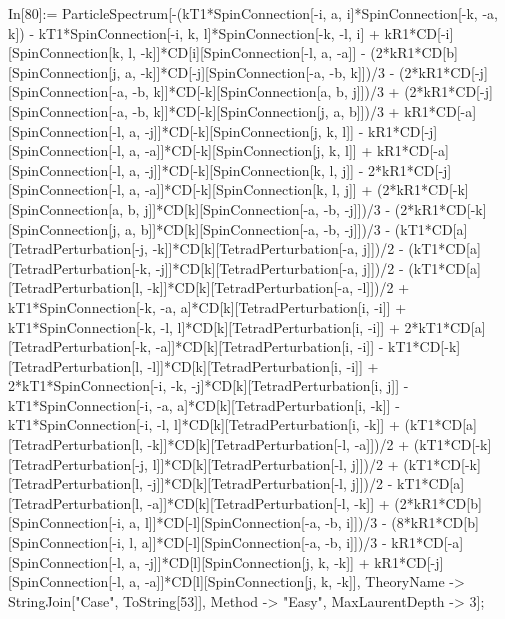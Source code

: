 In[80]:= ParticleSpectrum[-(kT1*SpinConnection[-i, a, i]*SpinConnection[-k, -a, k]) - kT1*SpinConnection[-i, k, l]*SpinConnection[-k, -l, i] + kR1*CD[-i][SpinConnection[k, l, -k]]*CD[i][SpinConnection[-l, a, -a]] - (2*kR1*CD[b][SpinConnection[j, a, -k]]*CD[-j][SpinConnection[-a, -b, k]])/3 - (2*kR1*CD[-j][SpinConnection[-a, -b, k]]*CD[-k][SpinConnection[a, b, j]])/3 + (2*kR1*CD[-j][SpinConnection[-a, -b, k]]*CD[-k][SpinConnection[j, a, b]])/3 + kR1*CD[-a][SpinConnection[-l, a, -j]]*CD[-k][SpinConnection[j, k, l]] - kR1*CD[-j][SpinConnection[-l, a, -a]]*CD[-k][SpinConnection[j, k, l]] + kR1*CD[-a][SpinConnection[-l, a, -j]]*CD[-k][SpinConnection[k, l, j]] - 2*kR1*CD[-j][SpinConnection[-l, a, -a]]*CD[-k][SpinConnection[k, l, j]] + (2*kR1*CD[-k][SpinConnection[a, b, j]]*CD[k][SpinConnection[-a, -b, -j]])/3 - (2*kR1*CD[-k][SpinConnection[j, a, b]]*CD[k][SpinConnection[-a, -b, -j]])/3 - (kT1*CD[a][TetradPerturbation[-j, -k]]*CD[k][TetradPerturbation[-a, j]])/2 - (kT1*CD[a][TetradPerturbation[-k, -j]]*CD[k][TetradPerturbation[-a, j]])/2 - (kT1*CD[a][TetradPerturbation[l, -k]]*CD[k][TetradPerturbation[-a, -l]])/2 + kT1*SpinConnection[-k, -a, a]*CD[k][TetradPerturbation[i, -i]] + kT1*SpinConnection[-k, -l, l]*CD[k][TetradPerturbation[i, -i]] + 2*kT1*CD[a][TetradPerturbation[-k, -a]]*CD[k][TetradPerturbation[i, -i]] - kT1*CD[-k][TetradPerturbation[l, -l]]*CD[k][TetradPerturbation[i, -i]] + 2*kT1*SpinConnection[-i, -k, -j]*CD[k][TetradPerturbation[i, j]] - kT1*SpinConnection[-i, -a, a]*CD[k][TetradPerturbation[i, -k]] - kT1*SpinConnection[-i, -l, l]*CD[k][TetradPerturbation[i, -k]] + (kT1*CD[a][TetradPerturbation[l, -k]]*CD[k][TetradPerturbation[-l, -a]])/2 + (kT1*CD[-k][TetradPerturbation[-j, l]]*CD[k][TetradPerturbation[-l, j]])/2 + (kT1*CD[-k][TetradPerturbation[l, -j]]*CD[k][TetradPerturbation[-l, j]])/2 - kT1*CD[a][TetradPerturbation[l, -a]]*CD[k][TetradPerturbation[-l, -k]] + (2*kR1*CD[b][SpinConnection[-i, a, l]]*CD[-l][SpinConnection[-a, -b, i]])/3 - (8*kR1*CD[b][SpinConnection[-i, l, a]]*CD[-l][SpinConnection[-a, -b, i]])/3 - kR1*CD[-a][SpinConnection[-l, a, -j]]*CD[l][SpinConnection[j, k, -k]] + kR1*CD[-j][SpinConnection[-l, a, -a]]*CD[l][SpinConnection[j, k, -k]], TheoryName -> StringJoin["Case", ToString[53]], Method -> "Easy", MaxLaurentDepth -> 3]; 